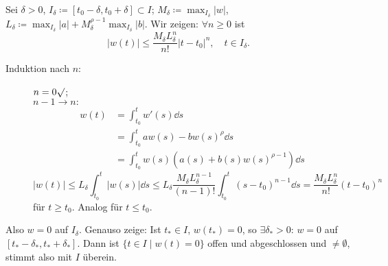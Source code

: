 \begin{beweis}
	Sei $ \delta>0 $, $I_\delta\coloneqq [t_0-\delta,t_0+\delta]\subset I $; $ M_\delta\coloneqq\max_{I_\delta} |w| $, $ L_\delta\coloneqq\max_{I_\delta}|a|+M_\delta^{\rho-1}\max_{I_\delta}|b| $. Wir zeigen: $ \forall n\geq 0 $ ist \[ |w(t)|\leq\frac{M_\delta L_\delta^n}{n!}|t-t_0|^n,\quad t\in I_\delta. \]
	\begin{description}
		\item[Induktion nach $ n $:] $ n=0\surd $;\\
		$ n-1\to n: $ \begin{align*}
		w(t)&=\int_{t_0}^t w'(s)\dd s\\
		&=\int_{t_0}^taw(s)-bw(s)^\rho\dd s\\
		&=\int_{t_0}^t w(s)(a(s)+b(s)w(s)^{\rho-1})\dd s
		\end{align*}
		\[ |w(t)|\leq L_\delta\int_{t_0}^t |w(s)|\dd s\leq L_\delta\frac{M_\delta L_\delta^{n-1}}{(n-1)!}\int_{t_0}^t (s-t_0)^{n-1}\dd s=\frac{M_\delta L_\delta^n}{n!}(t-t_0)^n \]
		f\"ur $ t\geq t_0 $. Analog f\"ur $ t\leq t_0 $.
	\end{description}
	Also $ w=0 $ auf $ I_\delta $. Genauso zeige: Ist $ t_\ast\in I $, $ w(t_\ast)=0 $, so $ \exists\delta_\ast>0 $: $ w=0 $ auf $ [t_\ast-\delta_\ast,t_\ast+\delta_\ast] $. Dann ist $ \lbrace t\in I\mid w(t)=0\rbrace $ offen und abgeschlossen und $ \neq\emptyset $, stimmt also mit $ I $ \"uberein.
\end{beweis}

